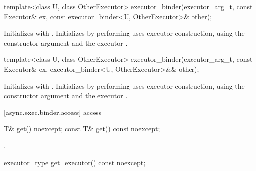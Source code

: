 \begin{itemdecl}
template<class U, class OtherExecutor>
  executor_binder(executor_arg_t, const Executor& ex,
    const executor_binder<U, OtherExecutor>& other);
\end{itemdecl}

\begin{itemdescr}
\pnum
{}

\pnum
\effects Initializes  with . Initializes  by performing uses-executor construction, using the constructor argument  and the executor .
\end{itemdescr}

\begin{itemdecl}
template<class U, class OtherExecutor>
  executor_binder(executor_arg_t, const Executor& ex,
    executor_binder<U, OtherExecutor>&& other);
\end{itemdecl}

\begin{itemdescr}

\pnum
{}

\pnum
\effects Initializes  with . Initializes  by performing uses-executor construction, using the constructor argument  and the executor .
\end{itemdescr}



[async.exec.binder.access]{ access}

%
\begin{itemdecl}
T& get() noexcept;
const T& get() const noexcept;
\end{itemdecl}

\begin{itemdescr}
\pnum
\returns {}.
\end{itemdescr}

%
\begin{itemdecl}
executor_type get_executor() const noexcept;
\end{itemdecl}

